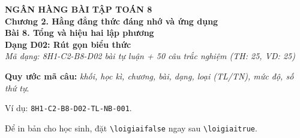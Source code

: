 \documentclass[12pt,a4paper]{article}
\newif\ifloigiai
\begin{document}
\begin{center}
{\Large\textbf{NGÂN HÀNG BÀI TẬP TOÁN 8}}\\[3pt]
\textbf{Chương 2. Hằng đẳng thức đáng nhớ và ứng dụng}\\[2pt]
\textbf{Bài 8. Tổng và hiệu hai lập phương}\\[2pt]
\textbf{Dạng D02: Rút gọn biểu thức}\\[2pt]
\textit{Mã dạng: 8H1-C2-B8-D02  bài tự luận + 50 câu trắc nghiệm \quad (TH: 25, VD: 25)}
\end{center}
\textbf{Quy ước mã câu:} \textit{khối, học kì, chương, bài, dạng, loại (TL/TN), mức độ, số thứ tự}.\par Ví dụ: \texttt{8H1-C2-B8-D02-TL-NB-001}.\par Để in bản cho học sinh, đặt \verb|\loigiaifalse| ngay sau \verb|\loigiaitrue|.
\end{document}
